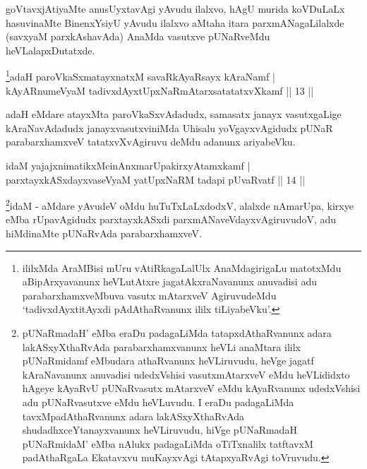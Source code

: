 \begin{artha}
goVtavxjAtiyaMte anusUyxtavAgi yAvudu ilalxvo, hAgU murida koVDuLaLx hasuvinaMte BinenxYsiyU yAvudu ilalxvo aMtaha itara parxmANagaLilalxde (savxyaM parxkAshavAda) AnaMda vasutxve pUNaRveMdu heVLalapxDutatxde.
\end{artha}



\begin{shl}
\footnote{ililxMda AraMBisi mUru vAtiRkagaLalUlx AnaMdagirigaLu matotxMdu aBipArxyavanunx heVLutAtxre \mdash  jagatAkxraNavanunx anuvadisi adu parabarxhamxveMbuva vasutx mAtarxveV AgiruvudeMdu `tadivxdAyxtitAyxdi pAdAthaRvanunx ililx tiLiyabeVku'.}adaH paroVkaSxmatayxnatxM savaRkAyaRsayx kAraNamf  | \\
kAyARnumeVyaM tadivxdAyxtUpxNaRmAtarxsatatatxvXkamf \hfill ||  13 ||  
\end{shl}

\begin{artha}
adaH eMdare atayxMta paroVkaSxvAdadudx, samasatx janayx vasutxgaLige kAraNavAdadudx janayxvasutxviniMda Uhisalu yoVgayxvAgidudx pUNaR parabarxhamxveV tatatxvXvAgiruvu deMdu adanunx ariyabeVku.
\end{artha}


\begin{shl}
idaM yajajxnimatikxMcinAnxmarUpakirxyAtamxkamf  | \\
parxtayxkASxdayxvaseVyaM yatUpxNaRM tadapi pUvaRvatf \hfill||  14 ||  
\end{shl}

\begin{artha}
\footnote{pUNaRmadaH' eMba eraDu padagaLiMda tatapxdAthaRvanunx adara lakASxyXthaRvAda parabarxhamxvanunx heVLi anaMtara ililx pUNaRmidamf eMbudara athaRvanunx heVLiruvudu, heVge jagatf kAraNavanunx anuvadisi udedxVshisi vasutxmAtarxveV eMdu heVLididxto hAgeye kAyaRvU pUNaRvasutx mAtarxveV eMdu kAyaRvanunx udedxVshisi adu pUNaRvasutxve eMdu heVLuvudu. I eraDu padagaLiMda tavxMpadAthaRvanunx adara lakASxyXthaRvAda shudadhxceYtanayxvanunx heVLiruvudu, hiVge pUNaRmadaH pUNaRmidaM' eMba nAlukx padagaLiMda oTiTxnalilx tatftavxM padAthaRgaLa Ekatavxvu muKayxvAgi tAtapxyaRvAgi toVruvudu.}idaM - aMdare yAvudeV oMdu huTuTxLaLxdodxV, alalxde nAmarUpa, kirxye eMba rUpavAgidudx parxtayxkASxdi parxmANaveVdayxvAgiruvudoV, adu hiMdinaMte pUNaRvAda parabarxhamxveV. 
\end{artha}

